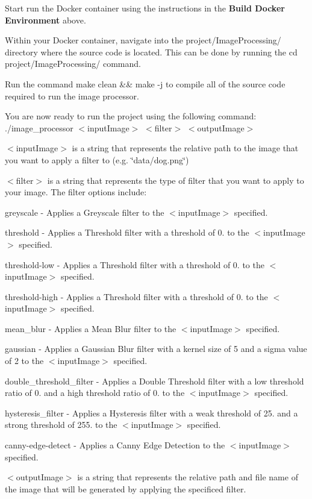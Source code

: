 \begin{DoxyEnumerate}
\item Start run the Docker container using the instructions in the {\bfseries Build Docker Environment} above.
\item Within your Docker container, navigate into the {\ttfamily project/\+Image\+Processing/} directory where the source code is located. This can be done by running the {\ttfamily cd project/\+Image\+Processing/} command.
\item Run the command {\ttfamily make clean \&\& make -\/j} to compile all of the source code required to run the image processor.
\item You are now ready to run the project using the following command\+: {\ttfamily ./image\+\_\+processor $<$input\+Image$>$ $<$filter$>$ $<$output\+Image$>$}
\begin{DoxyEnumerate}
\item {\ttfamily $<$input\+Image$>$} is a string that represents the relative path to the image that you want to apply a filter to (e.\+g. {\ttfamily \char`\"{}data/dog.\+png\char`\"{}})
\item {\ttfamily $<$filter$>$} is a string that represents the type of filter that you want to apply to your image. The filter options include\+:
\begin{DoxyEnumerate}
\item greyscale -\/ Applies a Greyscale filter to the {\ttfamily $<$input\+Image$>$} specified.
\item threshold -\/ Applies a Threshold filter with a threshold of 0. to the {\ttfamily $<$input\+Image$>$} specified.
\item threshold-\/low -\/ Applies a Threshold filter with a threshold of 0. to the {\ttfamily $<$input\+Image$>$} specified.
\item threshold-\/high -\/ Applies a Threshold filter with a threshold of 0. to the {\ttfamily $<$input\+Image$>$} specified.
\item mean\+\_\+blur -\/ Applies a Mean Blur filter to the {\ttfamily $<$input\+Image$>$} specified.
\item gaussian -\/ Applies a Gaussian Blur filter with a kernel size of 5 and a sigma value of 2 to the {\ttfamily $<$input\+Image$>$} specified.
\item double\+\_\+threshold\+\_\+filter -\/ Applies a Double Threshold filter with a low threshold ratio of 0. and a high threshold ratio of 0. to the {\ttfamily $<$input\+Image$>$} specified.
\item hysteresis\+\_\+filter -\/ Applies a Hysteresis filter with a weak threshold of 25. and a strong threshold of 255. to the {\ttfamily $<$input\+Image$>$} specified.
\item canny-\/edge-\/detect -\/ Applies a Canny Edge Detection to the {\ttfamily $<$input\+Image$>$} specified.
\end{DoxyEnumerate}
\item {\ttfamily $<$output\+Image$>$} is a string that represents the relative path and file name of the image that will be generated by applying the specificed filter.
\end{DoxyEnumerate}
\end{DoxyEnumerate}

